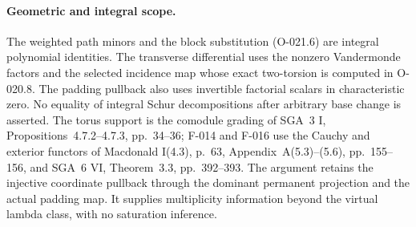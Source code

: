 \paragraph{Geometric and integral scope.}
The weighted path minors and the block substitution
(O-021.6) are integral polynomial identities. The
transverse differential uses the nonzero Vandermonde
factors and the selected incidence map whose exact
two-torsion is computed in O-020.8. The padding pullback
also uses invertible factorial scalars in characteristic
zero. No equality of integral Schur decompositions after
arbitrary base change is asserted.
The torus support is the comodule grading of SGA~3 I,
Propositions~4.7.2--4.7.3, pp.~34--36; F-014 and F-016
use the Cauchy and exterior functors of Macdonald I(4.3),
p.~63, Appendix~A(5.3)--(5.6), pp.~155--156, and
SGA~6 VI, Theorem~3.3, pp.~392--393.
The argument retains the injective coordinate pullback
through the dominant permanent projection and the actual
padding map. It supplies multiplicity information beyond
the virtual lambda class, with no saturation inference.
